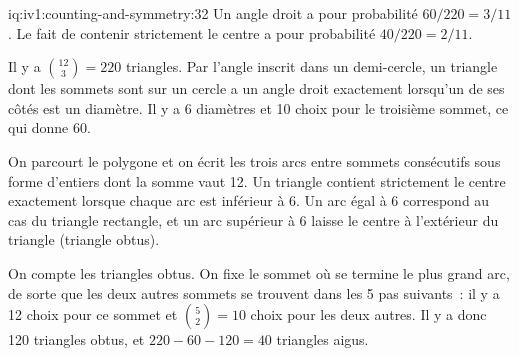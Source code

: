 \begin{solution}{iq:iv1:counting-and-symmetry:32}
Un angle droit a pour probabilité $60/220 = 3/11$. Le fait de contenir strictement le centre a pour probabilité $40/220 = 2/11$.

Il y a $\binom{12}{3} = 220$ triangles. Par l'angle inscrit dans un demi-cercle, un triangle dont les sommets sont sur un cercle a un angle droit exactement lorsqu'un de ses côtés est un diamètre. Il y a 6 diamètres et 10 choix pour le troisième sommet, ce qui donne 60.

On parcourt le polygone et on écrit les trois arcs entre sommets consécutifs sous forme d'entiers dont la somme vaut 12. Un triangle contient strictement le centre exactement lorsque chaque arc est inférieur à 6. Un arc égal à 6 correspond au cas du triangle rectangle, et un arc supérieur à 6 laisse le centre à l'extérieur du triangle (triangle obtus).

On compte les triangles obtus. On fixe le sommet où se termine le plus grand arc, de sorte que les deux autres sommets se trouvent dans les 5 pas suivants~: il y a 12 choix pour ce sommet et $\binom{5}{2} = 10$ choix pour les deux autres. Il y a donc 120 triangles obtus, et $220 - 60 - 120 = 40$ triangles aigus.

\end{solution}

